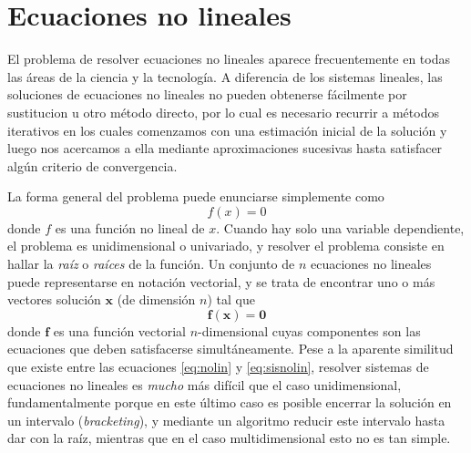 \section{Ecuaciones no lineales}\label{sec:enolin}
El problema de resolver ecuaciones no lineales aparece frecuentemente en todas las áreas de la ciencia y la tecnología. A diferencia de los sistemas lineales, las soluciones de ecuaciones no lineales no pueden obtenerse fácilmente por sustitucion u otro método directo, por lo cual es necesario recurrir a métodos iterativos en los cuales comenzamos con una estimación inicial de la solución y luego nos acercamos a ella mediante aproximaciones sucesivas hasta satisfacer algún criterio de convergencia.

La forma general del problema puede enunciarse simplemente como
\begin{equation}\label{eq:nolin}
 f(x) = 0
\end{equation} 
donde $f$ es una función no lineal de $x$. Cuando hay solo una variable dependiente, el problema es unidimensional o univariado, y resolver el problema consiste en hallar la \textit{raíz} o \textit{raíces} de la función. Un conjunto de $n$ ecuaciones no lineales puede representarse en notación vectorial, y se trata de encontrar uno o más vectores solución $\bm{x}$ (de dimensión $n$) tal que
\begin{equation}\label{eq:sisnolin}
 \bm{f}(\bm{x}) = \bm{0}
\end{equation} 
donde $\bm{f}$ es una función vectorial $n$-dimensional cuyas componentes son las ecuaciones que deben satisfacerse simultáneamente. Pese a la aparente similitud que existe entre las ecuaciones \eqref{eq:nolin} y \eqref{eq:sisnolin}, resolver sistemas de ecuaciones no lineales es \textit{mucho} más difícil que el caso unidimensional, fundamentalmente porque en este último caso es posible encerrar la solución en un intervalo (\textit{bracketing}), y mediante un algoritmo reducir este intervalo hasta dar con la raíz, mientras que en el caso multidimensional esto no es tan simple.


